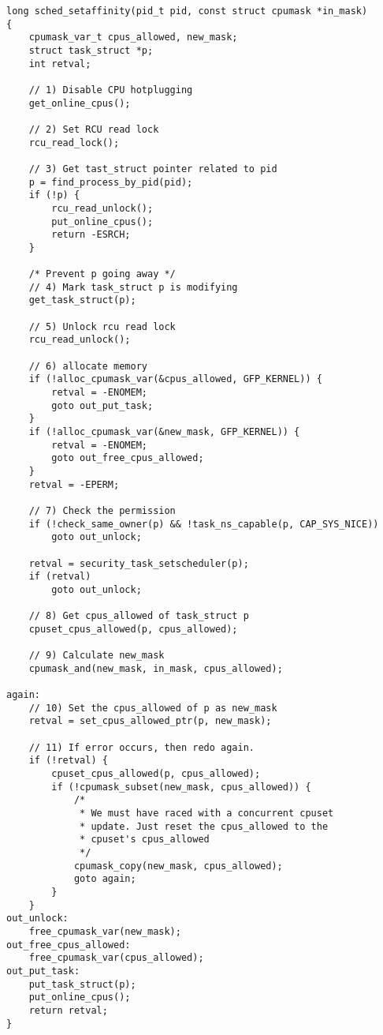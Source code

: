 \begin{lstlisting}
long sched_setaffinity(pid_t pid, const struct cpumask *in_mask)
{
    cpumask_var_t cpus_allowed, new_mask;
    struct task_struct *p;
    int retval;
	
    // 1) Disable CPU hotplugging
    get_online_cpus();

    // 2) Set RCU read lock
    rcu_read_lock();

    // 3) Get tast_struct pointer related to pid
    p = find_process_by_pid(pid);
    if (!p) {
        rcu_read_unlock();
        put_online_cpus();
        return -ESRCH;
    }    

    /* Prevent p going away */
    // 4) Mark task_struct p is modifying
    get_task_struct(p);

    // 5) Unlock rcu read lock
    rcu_read_unlock();

    // 6) allocate memory
    if (!alloc_cpumask_var(&cpus_allowed, GFP_KERNEL)) {
        retval = -ENOMEM;
        goto out_put_task;
    }    
    if (!alloc_cpumask_var(&new_mask, GFP_KERNEL)) {
        retval = -ENOMEM;
        goto out_free_cpus_allowed;
    }    
    retval = -EPERM;

    // 7) Check the permission
    if (!check_same_owner(p) && !task_ns_capable(p, CAP_SYS_NICE))
        goto out_unlock;

    retval = security_task_setscheduler(p);
    if (retval)
        goto out_unlock;

    // 8) Get cpus_allowed of task_struct p
    cpuset_cpus_allowed(p, cpus_allowed);

    // 9) Calculate new_mask
    cpumask_and(new_mask, in_mask, cpus_allowed);

again:
    // 10) Set the cpus_allowed of p as new_mask
    retval = set_cpus_allowed_ptr(p, new_mask);

    // 11) If error occurs, then redo again.
    if (!retval) {
        cpuset_cpus_allowed(p, cpus_allowed);
        if (!cpumask_subset(new_mask, cpus_allowed)) {
            /*
             * We must have raced with a concurrent cpuset
             * update. Just reset the cpus_allowed to the
             * cpuset's cpus_allowed
             */
            cpumask_copy(new_mask, cpus_allowed);  
            goto again;
        }
    }
out_unlock: 
    free_cpumask_var(new_mask); 
out_free_cpus_allowed:
    free_cpumask_var(cpus_allowed);
out_put_task:
    put_task_struct(p);
    put_online_cpus();
    return retval;
}
\end{lstlisting}

